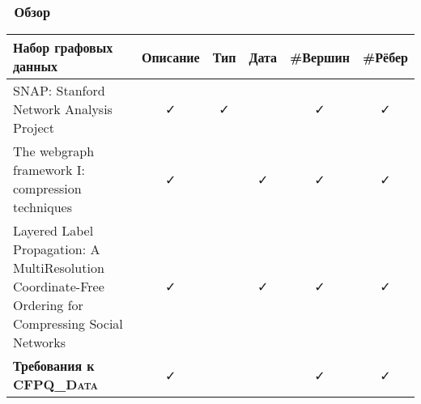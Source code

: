 \begin{frame}
	\transwipe[direction=90]
	\frametitle{\faEye\ Обзор}
		      
		

    \begin{center}
        \begin{tabular}{ |m{17em}||c|c|c|c|c| }
        \hline
        Набор графовых данных & Описание & Тип & Дата & \#Вершин & \#Рёбер \\
        \hline
        SNAP: Stanford Network Analysis Project & \color{green}\faCheck & \faCheck &  & \color{green}\faCheck & \color{green}\faCheck \\
        \hline
        The webgraph framework I: compression techniques & \color{green}\faCheck &  & \faCheck & \color{green}\faCheck & \color{green}\faCheck \\ 
        \hline
        Layered Label Propagation: A MultiResolution Coordinate-Free Ordering for Compressing Social Networks & \color{green}\faCheck &  & \faCheck & \color{green}\faCheck & \color{green}\faCheck \\ 
        \hline
        \hline
        \textbf{Требования к \textsc{CFPQ\_Data}} & \color{green}\faCheck & & & \color{green}\faCheck & \color{green}\faCheck \\
        \hline
        \end{tabular}
    \end{center}
\end{frame}
